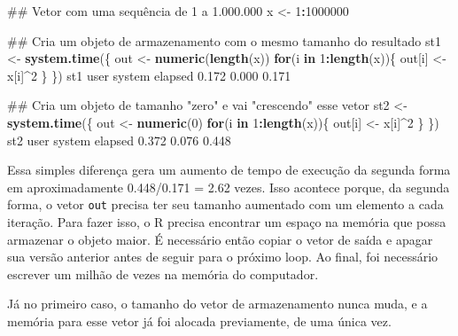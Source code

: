 \documentclass[10pt,a4paper]{book}
\newenvironment{Shaded}{\begin{snugshade}}{\end{snugshade}}
\newcommand{\KeywordTok}[1]{\textcolor[rgb]{0.13,0.29,0.53}{\textbf{#1}}}
\newcommand{\DecValTok}[1]{\textcolor[rgb]{0.00,0.00,0.81}{#1}}
\newcommand{\FloatTok}[1]{\textcolor[rgb]{0.00,0.00,0.81}{#1}}
\newcommand{\StringTok}[1]{\textcolor[rgb]{0.31,0.60,0.02}{#1}}
\newcommand{\ControlFlowTok}[1]{\textcolor[rgb]{0.13,0.29,0.53}{\textbf{#1}}}
\newcommand{\OperatorTok}[1]{\textcolor[rgb]{0.81,0.36,0.00}{\textbf{#1}}}
\newcommand{\NormalTok}[1]{#1}
\begin{document}
\begin{Shaded}
\begin{Highlighting}[]
\NormalTok{## Vetor com uma sequência de 1 a 1.000.000}
\NormalTok{x <-}\StringTok{ }\DecValTok{1}\OperatorTok{:}\DecValTok{1000000}

\NormalTok{## Cria um objeto de armazenamento com o mesmo tamanho do resultado}
\NormalTok{st1 <-}\StringTok{ }\KeywordTok{system.time}\NormalTok{(\{}
\NormalTok{    out <-}\StringTok{ }\KeywordTok{numeric}\NormalTok{(}\KeywordTok{length}\NormalTok{(x))}
    \ControlFlowTok{for}\NormalTok{(i }\ControlFlowTok{in} \DecValTok{1}\OperatorTok{:}\KeywordTok{length}\NormalTok{(x))\{}
\NormalTok{        out[i] <-}\StringTok{ }\NormalTok{x[i]}\OperatorTok{^}\DecValTok{2}
\NormalTok{    \}}
\NormalTok{\})}
\NormalTok{st1}
\NormalTok{   user  system elapsed }
  \FloatTok{0.172}   \FloatTok{0.000}   \FloatTok{0.171} 

\NormalTok{## Cria um objeto de tamanho "zero" e vai "crescendo" esse vetor}
\NormalTok{st2 <-}\StringTok{ }\KeywordTok{system.time}\NormalTok{(\{}
\NormalTok{    out <-}\StringTok{ }\KeywordTok{numeric}\NormalTok{(}\DecValTok{0}\NormalTok{)}
    \ControlFlowTok{for}\NormalTok{(i }\ControlFlowTok{in} \DecValTok{1}\OperatorTok{:}\KeywordTok{length}\NormalTok{(x))\{}
\NormalTok{        out[i] <-}\StringTok{ }\NormalTok{x[i]}\OperatorTok{^}\DecValTok{2}
\NormalTok{    \}}
\NormalTok{\})}
\NormalTok{st2}
\NormalTok{   user  system elapsed }
  \FloatTok{0.372}   \FloatTok{0.076}   \FloatTok{0.448} 
\end{Highlighting}
\end{Shaded}

Essa simples diferença gera um aumento de tempo de execução da segunda
forma em aproximadamente 0.448/0.171 = 2.62 vezes. Isso acontece porque,
da segunda forma, o vetor \texttt{out} precisa ter seu tamanho aumentado
com um elemento a cada iteração. Para fazer isso, o R precisa encontrar
um espaço na memória que possa armazenar o objeto maior. É necessário
então copiar o vetor de saída e apagar sua versão anterior antes de
seguir para o próximo loop. Ao final, foi necessário escrever um milhão
de vezes na memória do computador.

Já no primeiro caso, o tamanho do vetor de armazenamento nunca muda, e a
memória para esse vetor já foi alocada previamente, de uma única vez.
\end{document}
